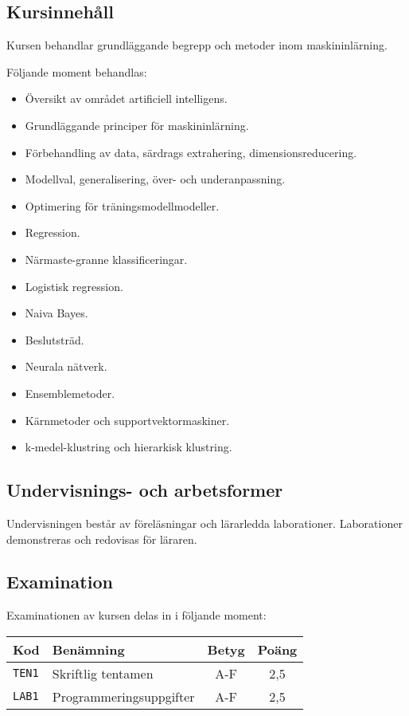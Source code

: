 \subsection*{Kursinnehåll}

Kursen behandlar grundläggande begrepp och metoder inom maskininlärning.

Följande moment behandlas:

\begin{itemize}
\tightlist
\item
  Översikt av området artificiell intelligens.
\item
  Grundläggande principer för maskininlärning.
\item
  Förbehandling av data, särdrags extrahering, dimensionsreducering.
\item
  Modellval, generalisering, över- och underanpassning.
\item
  Optimering för träningsmodellmodeller.
\item
  Regression.
\item
  Närmaste-granne klassificeringar.
\item
  Logistisk regression.
\item
  Naiva Bayes.
\item
  Beslutsträd.
\item
  Neurala nätverk.
\item
  Ensemblemetoder.
\item
  Kärnmetoder och supportvektormaskiner.
\item
  k-medel-klustring och hierarkisk klustring.
\end{itemize}

\subsection*{Undervisnings- och
arbetsformer}

Undervisningen består av föreläsningar och lärarledda laborationer.
Laborationer demonstreras och redovisas för läraren.

\subsection*{Examination}

Examinationen av kursen delas in i följande moment:

\begin{longtable}[]{@{}llcc@{}}
\toprule
\textsf{Kod} & \textsf{Benämning} & \textsf{Betyg} & \textsf{Poäng}\tabularnewline
\midrule
\endhead
\texttt{TEN1} & Skriftlig tentamen & A-F & 2,5\tabularnewline
\texttt{LAB1} & Programmeringsuppgifter & A-F & 2,5\tabularnewline
\bottomrule
\end{longtable}

